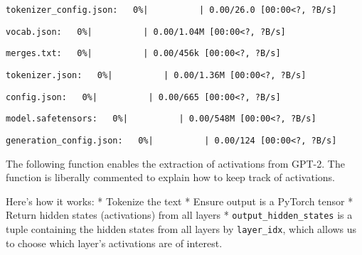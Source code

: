 \documentclass[
  letterpaper,
  DIV=11,
  numbers=noendperiod]{scrreprt}
\begin{document}
\begin{verbatim}
tokenizer_config.json:   0%|          | 0.00/26.0 [00:00<?, ?B/s]
\end{verbatim}

\begin{verbatim}
vocab.json:   0%|          | 0.00/1.04M [00:00<?, ?B/s]
\end{verbatim}

\begin{verbatim}
merges.txt:   0%|          | 0.00/456k [00:00<?, ?B/s]
\end{verbatim}

\begin{verbatim}
tokenizer.json:   0%|          | 0.00/1.36M [00:00<?, ?B/s]
\end{verbatim}

\begin{verbatim}
config.json:   0%|          | 0.00/665 [00:00<?, ?B/s]
\end{verbatim}

\begin{verbatim}
model.safetensors:   0%|          | 0.00/548M [00:00<?, ?B/s]
\end{verbatim}

\begin{verbatim}
generation_config.json:   0%|          | 0.00/124 [00:00<?, ?B/s]
\end{verbatim}

The following function enables the extraction of activations from GPT-2.
The function is liberally commented to explain how to keep track of
activations.

Here's how it works: * Tokenize the text * Ensure output is a PyTorch
tensor * Return hidden states (activations) from all layers *
\texttt{output\_hidden\_states} is a tuple containing the hidden states
from all layers by \texttt{layer\_idx}, which allows us to choose which
layer's activations are of interest.
\end{document}
